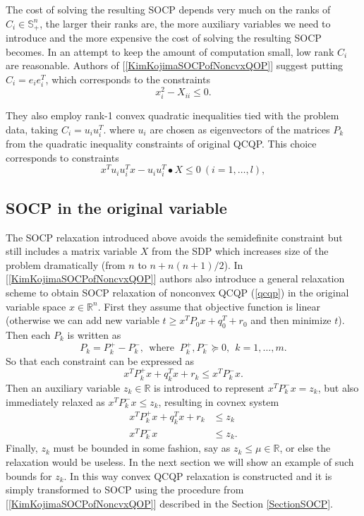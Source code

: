 \documentclass[12pt]{book}
\theoremstyle{definition}
\begin{document}
The cost of solving the resulting SOCP depends very much on the ranks of $C_i \in \mathbb{S}^n_+$, 
the larger their ranks are, the more auxiliary variables we need to 
introduce and the more expensive the cost of solving the resulting SOCP becomes. In an
attempt to keep the amount of computation small, low rank $C_i$ are
reasonable. Authors of [\ref{KimKojimaSOCPofNoncvxQOP}] suggest putting $C_i = e_ie_i^T$, which corresponds to the constraints
\begin{equation*}
x_i^2 - X_{ii} \leq 0.
\end{equation*}

They also employ rank-1 convex quadratic inequalities tied with the problem data, taking $C_i = u_iu^T_i$. 
where $u_i$ are chosen as eigenvectors of the matrices $P_k$ from the quadratic inequality constraints of original QCQP. This choice corresponds to constraints
\begin{equation*}
x^Tu_iu_i^Tx - u_iu_i^T\bullet X \leq 0 \ (i = 1,\dots ,l),
\end{equation*}
 	


\subsection{SOCP in the original variable}

The SOCP relaxation introduced above avoids the semidefinite constraint but still includes a matrix variable $X$ from the SDP which increases size of the problem dramatically (from $n$ to $n+ n(n+1)/2$). In [\ref{KimKojimaSOCPofNoncvxQOP}] authors also introduce a general relaxation scheme to obtain SOCP relaxation of nonconvex QCQP (\ref{qcqp}) in the original variable space $x\in \mathbb{R}^n$. First they assume that objective function is linear (otherwise we can add new variable $t\geq x^TP_0x + q_0^T + r_0$ and then minimize $t$). Then each $P_k$ is written as 
$$P_k=P_k^+ -P_k^-, \ \ \mbox{where } \ P_k^+, P_k^- \succeq 0, \ \ k=1,\dots ,m.$$ 
So that each constraint can be expressed as 
\begin{equation*}
x^TP_k^+x + q_k^Tx + r_k \leq x^TP_k^-x.
\end{equation*}
Then an auxiliary variable $z_k\in \mathbb{R}$ is introduced to represent $x^TP_k^-x = z_k$, but also immediately relaxed as $x^TP_k^-x \leq z_k$, resulting in covnex system
\begin{equation*}
\begin{array}{rl}
x^TP_k^+x + q_k^Tx + r_k &\leq z_k  \\
x^TP_k^-x & \leq z_k.
\end{array} 
\end{equation*}
Finally, $z_k$ must be bounded in some fashion, say as $z_k\leq \mu \in \mathbb{R}$, or else the relaxation would be useless. In the next section we will show an example of such bounds for $z_k$.
In this way convex QCQP relaxation is constructed and it is simply transformed to SOCP using the procedure from [\ref{KimKojimaSOCPofNoncvxQOP}] described in the Section \ref{SectionSOCP}. 
\end{document}
